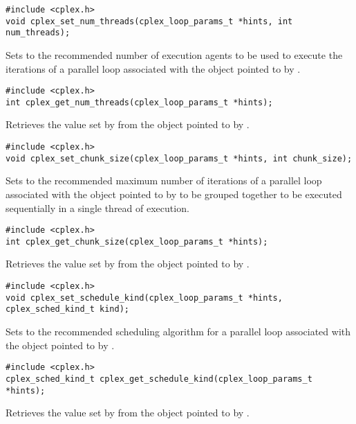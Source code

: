 \begin{verbatim}
#include <cplex.h>
void cplex_set_num_threads(cplex_loop_params_t *hints, int num_threads);
\end{verbatim}

\pnum
Sets to
the recommended number of execution agents to be used
to execute the iterations of a parallel loop
associated with the object pointed to by
.

\begin{verbatim}
#include <cplex.h>
int cplex_get_num_threads(cplex_loop_params_t *hints);
\end{verbatim}

\pnum
Retrieves the value set by
from the object pointed to by
.

\begin{verbatim}
#include <cplex.h>
void cplex_set_chunk_size(cplex_loop_params_t *hints, int chunk_size);
\end{verbatim}

\pnum
Sets to
the recommended maximum number of iterations
of a parallel loop associated with the object pointed to by
to be grouped together to be executed sequentially
in a single thread of execution.

\begin{verbatim}
#include <cplex.h>
int cplex_get_chunk_size(cplex_loop_params_t *hints);
\end{verbatim}

\pnum
Retrieves the value set by
from the object pointed to by
.

\begin{verbatim}
#include <cplex.h>
void cplex_set_schedule_kind(cplex_loop_params_t *hints, cplex_sched_kind_t kind);
\end{verbatim}

\pnum
Sets to
the recommended scheduling algorithm
for a parallel loop associated with the object pointed to by
.

\begin{verbatim}
#include <cplex.h>
cplex_sched_kind_t cplex_get_schedule_kind(cplex_loop_params_t *hints);
\end{verbatim}

\pnum
Retrieves the value set by
from the object pointed to by
.